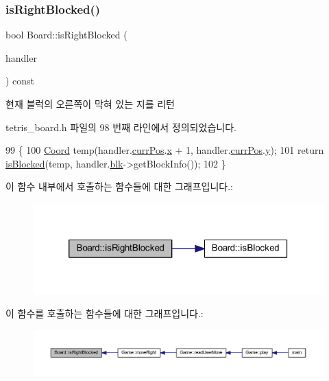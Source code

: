 \subsubsection{\texorpdfstring{is\+Right\+Blocked()}{isRightBlocked()}}
{\footnotesize\ttfamily bool Board\+::is\+Right\+Blocked (\begin{DoxyParamCaption}\item[{const \mbox{\hyperlink{class_block_handler}{Block\+Handler}} \&}]{handler }\end{DoxyParamCaption}) const\hspace{0.3cm}{\ttfamily [inline]}}



현재 블럭의 오른쪽이 막혀 있는 지를 리턴 



tetris\+\_\+board.\+h 파일의 98 번째 라인에서 정의되었습니다.


\begin{DoxyCode}
99     \{
100         \mbox{\hyperlink{struct_coord}{Coord}} temp(handler.\mbox{\hyperlink{class_block_handler_a11bd634fdc179446f9c6751e2394999e}{currPos}}.\mbox{\hyperlink{struct_coord_a696eaa744360fc791d0e3b331c549dbe}{x}} + 1, handler.\mbox{\hyperlink{class_block_handler_a11bd634fdc179446f9c6751e2394999e}{currPos}}.\mbox{\hyperlink{struct_coord_a214166cca70cef7dda9201689c3e81ab}{y}});
101         \textcolor{keywordflow}{return} \mbox{\hyperlink{class_board_a61ff9b1284e5c3e1214a780361ed650b}{isBlocked}}(temp, handler.\mbox{\hyperlink{class_block_handler_ab57212ded2552ab5559d278c8538c454}{blk}}->getBlockInfo());
102     \}
\end{DoxyCode}
이 함수 내부에서 호출하는 함수들에 대한 그래프입니다.\+:
\nopagebreak
\begin{figure}[H]
\begin{center}
\leavevmode
\includegraphics[width=320pt]{class_board_ad38cdb8757f58a32b5747e2b7e0be277_cgraph}
\end{center}
\end{figure}
이 함수를 호출하는 함수들에 대한 그래프입니다.\+:
\nopagebreak
\begin{figure}[H]
\begin{center}
\leavevmode
\includegraphics[width=350pt]{class_board_ad38cdb8757f58a32b5747e2b7e0be277_icgraph}
\end{center}
\end{figure}
\mbox{\label{class_board_a5df9c4c18c53b8029e0a080e5e089732}} 

